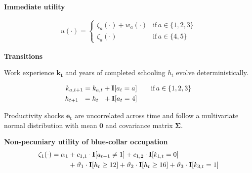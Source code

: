 \begin{frame}

\end{frame}
\begin{frame}\textbf{Immediate utility}\vspace{0.3cm}

  \begin{align*}
  u(\cdot) =
  \begin{cases}
      \zeta_a(\cdot)  + w_a(\cdot)                & \text{if}\, a \in \{1, 2, 3\}  \\
      \zeta_a(\cdot)                                                  &  \text{if}\, a \in \{4, 5\}
  \end{cases}
  \end{align*}

\end{frame}
\begin{frame}\textbf{Transitions}\vspace{0.3cm}

  Work experience $\bm{k_t}$  and years of completed schooling $h_t$ evolve deterministically.

  \begin{align*}
  k_{a,t+1} = k_{a,t} + {\textbf{I}}[a_t = a]  &\qquad \text{if}\, a \in \{1, 2, 3\} \\
  h_{t + 1\phantom{,a}} = h_{t\phantom{,a}} +   {\textbf{I}}[a_t = 4]  &\qquad\\
  \end{align*}

  Productivity shocks $\bm{e_t}$ are uncorrelated across time and follow a multivariate normal distribution with mean $\bm{0}$ and covariance matrix $\bm{\Sigma}$.

\end{frame}
\begin{frame}\textbf{Non-pecuniary utility of blue-collar occupation}\vspace{0.3cm}
%
  \begin{align*}
  \zeta_{1}(\cdot)  = \alpha_1 & + c_{1,1} \cdot {\textbf{I}}[a_{t-1} \neq 1] + c_{1,2} \cdot {\textbf{I}}[k_{1,t} = 0] \\
                              & + \vartheta_1 \cdot {\textbf{I}}[h_t \geq 12] + \vartheta_2 \cdot {\textbf{I}}[h_t \geq 16] + \vartheta_3 \cdot {\textbf{I}}[k_{3,t} = 1]
  \end{align*}
\end{frame}
